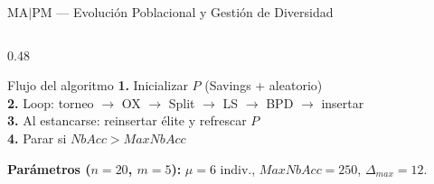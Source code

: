\documentclass[aspectratio=169,10pt]{beamer}
\begin{document}
\begin{frame}{MA$|$PM --- Evolución Poblacional y Gestión de Diversidad}
\begin{columns}[T,onlytextwidth]
\begin{column}{0.48\textwidth}
      \begin{block}{Flujo del algoritmo}\footnotesize
        \textbf{1.} Inicializar $P$ (Savings + aleatorio)\\
        \textbf{2.} Loop: torneo $\to$ OX $\to$ Split $\to$ LS $\to$ BPD $\to$ insertar\\
        \textbf{3.} Al estancarse: reinsertar élite y refrescar $P$\\
        \textbf{4.} Parar si $NbAcc > MaxNbAcc$
      \end{block}
      \vspace{0.15em}
      {\scriptsize\textbf{Parámetros ($n{=}20$, $m{=}5$):}
       $\mu{=}6$ indiv.,\; $MaxNbAcc{=}250$,\; $\Delta_{max}{=}12$.}
    \end{column}
  \end{columns}
\end{frame}
\end{document}
